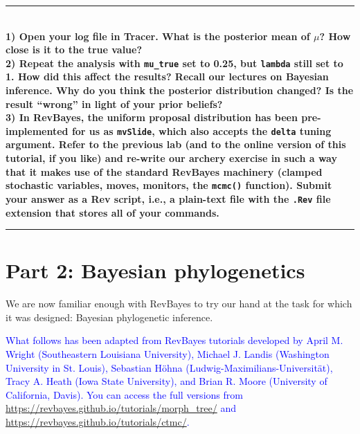 \documentclass[12pt]{article}
\begin{document}
\vspace*{1ex}

\hrule
\ \\[1ex]
\textbf{1) Open your log file in Tracer. What is the posterior mean of $\mu$? How close is it to the true value?} \\

\noindent \textbf{2) Repeat the analysis with \texttt{mu\_true} set to 0.25, but \texttt{lambda} still set to 1. How did this affect the results? Recall our lectures on Bayesian inference. Why do you think the posterior distribution changed? Is the result ``wrong'' in light of your prior beliefs?} \\

\noindent \textbf{3) In RevBayes, the uniform proposal distribution has been pre-implemented for us as \texttt{mvSlide}, which also accepts the \texttt{delta} tuning argument. Refer to the previous lab (and to the online version of this tutorial, if you like) and re-write our archery exercise in such a way that it makes use of the standard RevBayes machinery (clamped stochastic variables, moves, monitors, the \texttt{mcmc()} function). Submit your answer as a Rev script, i.e., a plain-text file with the \texttt{.Rev} file extension that stores all of your commands.} \\
\hrule

\newpage

\section*{Part 2: Bayesian phylogenetics}

We are now familiar enough with RevBayes to try our hand at the task for which it was designed: Bayesian phylogenetic inference.

\vspace*{1ex}

\begin{center}
\textcolor{blue}{What follows has been adapted from RevBayes tutorials developed by April M. Wright (Southeastern Louisiana University), Michael J. Landis (Washington University in St. Louis), Sebastian H\"{o}hna (Ludwig-Maximilians-Universit\"{a}t), Tracy A. Heath (Iowa State University), and Brian R. Moore (University of California, Davis). You can access the full versions from 
\url{https://revbayes.github.io/tutorials/morph_tree/} and \url{https://revbayes.github.io/tutorials/ctmc/}.}
\end{center}

\vspace*{1ex}
\end{document}

